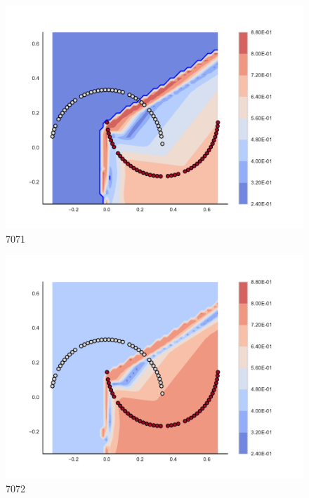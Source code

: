 \begin{subfigure}[b]{0.09\textwidth}
    \includegraphics[clip, trim=2.35cm 1.75cm 4.5cm 0cm,width=\textwidth]{img/convergence/7071.pdf}
    \caption{7071}
    \label{fig:convergence_7071}
\end{subfigure}
%
\begin{subfigure}[b]{0.09\textwidth}
    \includegraphics[clip, trim=2.35cm 1.75cm 4.5cm 0cm,width=\textwidth]{img/convergence/7072.pdf}
    \caption{7072}
    \label{fig:convergence_7072}
\end{subfigure}
%
